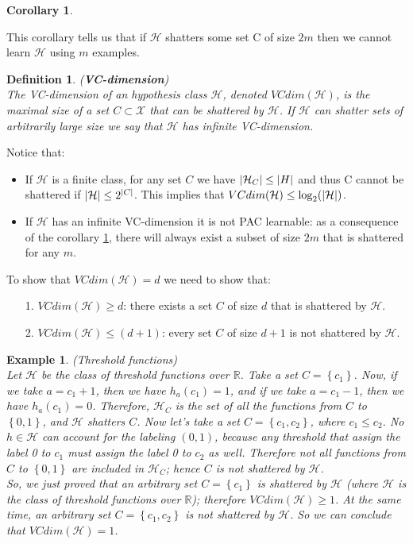 \documentclass[12pt]{report}
\theoremstyle{plain}
\newtheorem{definition}{Definition}[chapter]
\newtheorem{example}{Example}[chapter]
\newtheorem{corollary}{Corollary}[theorem]
\newcommand\mcl[1]{\mathcal{#1}}
\begin{document}
\begin{flushleft}
\begin{corollary}
	\label{cor:NFL_shattering}
\end{corollary}
This corollary tells us that if $\mcl{H}$ shatters some set C of size $2m$ then we cannot learn $\mcl{H}$ using $m$ examples.
\begin{definition}(\textbf{VC-dimension})\\
	The VC-dimension of an hypothesis class $\mcl{H}$, denoted $VCdim(\mcl{H})$, is the maximal size of a set $C\subset\mcl{X}$ that can be shattered by $\mcl{H}$. If $\mcl{H}$ can shatter sets of arbitrarily large size we say that $\mcl{H}$ has infinite VC-dimension.
\end{definition}

Notice that:
\begin{itemize}
	\item If $\mcl{H}$ is a finite class, for any set $C$ we have $\abs{\mcl{H}_C}\leq\abs{H}$ and thus C cannot be shattered if $\abs{\mcl{H}}\leq2^\abs{C}$. This implies that $VCdim(\mcl{H})\leq\log_2(\abs{\mcl{H}})$.
	\item If $\mcl{H}$ has an infinite VC-dimension it is not PAC learnable: as a consequence of the corollary \ref{cor:NFL_shattering}, there will always exist a subset of size $2m$ that is shattered for any $m$.
\end{itemize}

To show that $VCdim(\mcl{H})=d$ we need to show that:
\begin{itemize}
	\item[1.] $VCdim(\mcl{H})\geq d$: there exists a set $C$ of size $d$ that is shattered by $\mcl{H}$.
	\item[2.] $VCdim(\mcl{H})\leq (d+1)$: every set $C$ of size $d+1$ is not shattered by $\mcl{H}$.
\end{itemize}

\begin{example} (Threshold functions)\\
	Let $\mcl{H}$ be the class of threshold functions over $\mathds{R}$. Take a set $C=\left\{c_1\right\}$. Now, if we take $a=c_1+1$, then we have $h_a(c_1)=1$, and if we take $a=c_1-1$, then we have $h_a(c_1)=0$. Therefore, $\mcl{H}_C$ is the set of all the functions from $C$ to $\left\{0,1\right\}$, and $\mcl{H}$ shatters $C$. Now let's take a set $C=\left\{c_1,c_2\right\}$, where $c_1\leq c_2$. No $h\in\mcl{H}$ can account for the labeling $(0,1)$, because any threshold that assign the label 0 to $c_1$ must assign the label 0 to $c_2$ as well. Therefore not all functions from $C$ to $\left\{0,1\right\}$ are included in $\mcl{H}_C$; hence $C$ is not shattered by $\mcl{H}$.\\
	So, we just proved that an arbitrary set $C=\left\{c_1\right\}$ is shattered by $\mcl{H}$ (where $\mcl{H}$ is the class of threshold functions over $\mathds{R}$); therefore $VCdim(\mcl{H})\geq 1$. At the same time, an arbitrary set $C=\left\{c_1,c_2\right\}$ is not shattered by $\mcl{H}$. So we can conclude that $VCdim(\mcl{H})=1$.
\end{example}


\end{flushleft}
\end{document}
